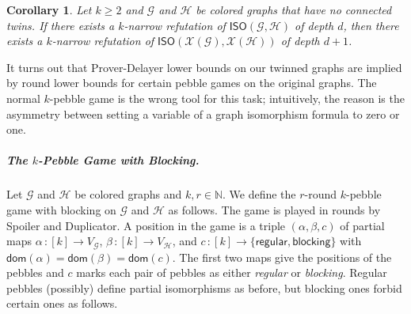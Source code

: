 \documentclass[10pt,a4paper]{article}
\newcommand{\defining}[1]{\emph{#1}}
\newcommand{\regular}{\mathsf{regular}}
\newcommand{\blocking}{\mathsf{blocking}}
\newcommand{\graphG}{\mathcal{G}}
\newcommand{\graphH}{\mathcal{H}}
\newcommand{\vertexG}{V_{\graphG}}
\newcommand{\vertexH}{V_{\graphH}}
\newcommand{\dom}{\mathsf{dom}}
\newcommand{\graphXG}{\mathcal{X}(\mathcal{G})}
\newcommand{\graphXH}{\mathcal{X}(\mathcal{H})}
\newcommand{\ISO}{\mathsf{ISO}(\graphG, \graphH)}
\newcommand{\XISO}{\mathsf{ISO}(\graphXG, \graphXH)}
\newtheorem{corollary}[theorem]{Corollary}
\begin{document}
\begin{corollary} \label{cor: spoiler_win}
Let $k \ge 2$ and $\graphG$ and $\graphH$ be colored graphs that have no connected twins.
If there exists a $k$-narrow refutation of $\ISO$ of depth $d$,
then there exists a $k$-narrow refutation of $\XISO$ of depth $d+1$.
\end{corollary}

%
%
\noindent It turns out that Prover-Delayer lower bounds on our twinned graphs are implied by round lower bounds for certain pebble games on the original graphs. The normal $k$-pebble game is the wrong tool for this task; intuitively,
the reason is the asymmetry between setting a variable of a graph isomorphism formula to zero or one.

\subparagraph*{The \texorpdfstring{$k$}{k}-Pebble Game with Blocking.}

Let $\graphG$ and $\graphH$ be colored graphs and $k, r \in \mathbb{N}$. We define the $r$-round $k$-pebble game with blocking on $\graphG$ and  $\graphH$ as follows. The game is played in rounds by Spoiler and Duplicator. A position in the game is a triple 
$(\alpha, \beta, c)$ of partial maps $\alpha\, \colon [k] \to \vertexG $, $\beta \, \colon [k] \to \vertexH$, and $c \,\colon [k] \to \{\regular, \blocking\}$
with $\dom(\alpha) = \dom(\beta) = \dom(c)$.
The first two maps give the positions of the pebbles and $c$ marks each pair of pebbles as either \defining{regular} or \defining{blocking}.
Regular pebbles (possibly) define partial isomorphisms as before, but blocking ones forbid certain ones as follows.
\end{document}
